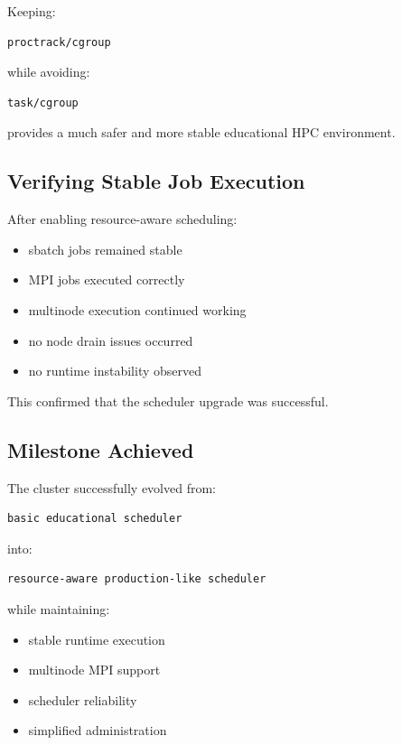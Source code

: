 \documentclass[11pt]{article}
\begin{document}
Keeping:

\begin{verbatim}
proctrack/cgroup
\end{verbatim}

while avoiding:

\begin{verbatim}
task/cgroup
\end{verbatim}

provides a much safer and more stable educational HPC environment.
\subsection{Verifying Stable Job Execution}
\label{sec:org3e584ee}

After enabling resource-aware scheduling:

\begin{itemize}
\item sbatch jobs remained stable
\item MPI jobs executed correctly
\item multinode execution continued working
\item no node drain issues occurred
\item no runtime instability observed
\end{itemize}

This confirmed that the scheduler upgrade was successful.
\subsection{Milestone Achieved}
\label{sec:orgb7b6c0b}

The cluster successfully evolved from:

\begin{verbatim}
basic educational scheduler
\end{verbatim}

into:

\begin{verbatim}
resource-aware production-like scheduler
\end{verbatim}

while maintaining:

\begin{itemize}
\item stable runtime execution
\item multinode MPI support
\item scheduler reliability
\item simplified administration
\end{itemize}
\end{document}
